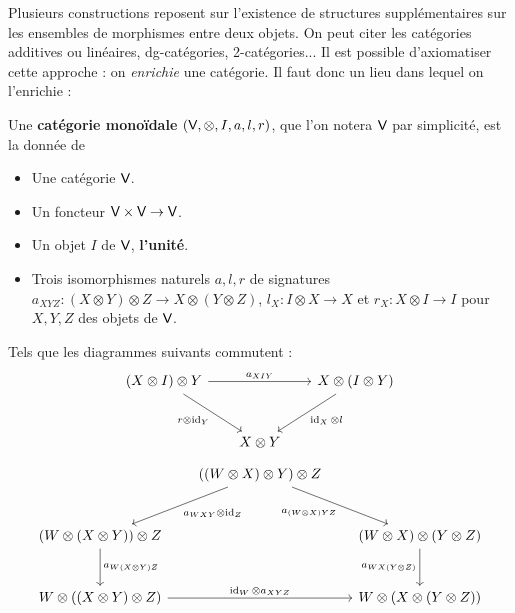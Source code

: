\documentclass[8pt,a4paper,french,draft]{article}
\newcommand{\cat}[1]{\textcat{#1}}
\newcommand{\textcat}[1]{{\normalfont\textsf{#1}}}
\DeclareMathOperator{\id}{id}
\theoremstyle{plain}
\theoremstyle{definition}
\theoremstyle{remark}
\begin{document}
Plusieurs constructions reposent sur l'existence de structures supplémentaires sur les ensembles de morphismes entre deux objets. On peut citer les catégories additives ou linéaires, dg-catégories, 2-catégories... Il est possible d'axiomatiser cette approche : on \textit{enrichie} une catégorie. Il faut donc un lieu dans lequel on l'enrichie :

\begin{definition}
    Une \textbf{catégorie monoïdale} $(\cat{V}, \otimes, I, a, l, r)$, que l'on notera $\cat{V}$ par simplicité, est la donnée de
    \begin{itemize}
        \item Une catégorie $\cat{V}$.
        \item Un foncteur $\cat{V}\times\cat{V} \to \cat{V}$.
        \item Un objet $I$ de $\cat{V}$, \textbf{l'unité}.
        \item Trois isomorphismes naturels $a, l, r$ de signatures $a_{XYZ} : (X \otimes Y) \otimes Z \to X \otimes (Y \otimes Z)$, $l_X : I \otimes X \to X$ et $r_X : X \otimes I \to I$ pour $X, Y, Z$ des objets de $\cat{V}$.
    \end{itemize}
    Tels que les diagrammes suivants commutent :
    \[\begin{tikzcd}[sep=scriptsize]
        {(X \otimes I) \otimes Y} \ar[rr, "a_{XIY}"]
        \ar[rdd, "r \otimes \id_Y"'] && {X \otimes (I \otimes Y)}
        \ar[ldd, "\id_X \otimes l"]\\
        \\
        & {X \otimes Y}
    \end{tikzcd}\]
    \[\begin{tikzcd}[sep=scriptsize]
        & {((W \otimes X) \otimes Y) \otimes Z} & \\
        \\
        {(W \otimes (X \otimes Y)) \otimes Z} && {(W \otimes X) \otimes (Y \otimes Z)} \\
        \\
        {W \otimes ((X \otimes Y) \otimes Z)} && {W \otimes (X \otimes (Y \otimes Z))}
        \arrow["{a_{WXY} \otimes \id_Z}", from=1-2, to=3-1]
        \arrow["{a_{(W \otimes X)YZ}}"', from=1-2, to=3-3]
        \arrow["{a_{W(X \otimes Y)Z}}", from=3-1, to=5-1]
        \arrow["{a_{WX(Y \otimes Z)}}"', from=3-3, to=5-3]
        \arrow["{\id_W \otimes a_{XYZ}}", from=5-1, to=5-3]
    \end{tikzcd}\]
\end{definition}
\end{document}
